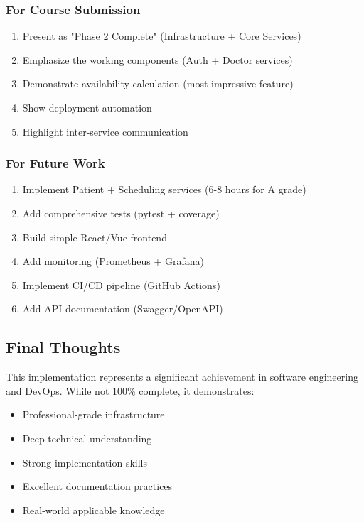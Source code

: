 \documentclass[12pt,a4paper]{article}
\begin{document}
\subsubsection{For Course Submission}
\begin{enumerate}
    \item Present as "Phase 2 Complete" (Infrastructure + Core Services)
    \item Emphasize the working components (Auth + Doctor services)
    \item Demonstrate availability calculation (most impressive feature)
    \item Show deployment automation
    \item Highlight inter-service communication
\end{enumerate}

\subsubsection{For Future Work}
\begin{enumerate}
    \item Implement Patient + Scheduling services (6-8 hours for A grade)
    \item Add comprehensive tests (pytest + coverage)
    \item Build simple React/Vue frontend
    \item Add monitoring (Prometheus + Grafana)
    \item Implement CI/CD pipeline (GitHub Actions)
    \item Add API documentation (Swagger/OpenAPI)
\end{enumerate}

\subsection{Final Thoughts}

This implementation represents a significant achievement in software engineering and DevOps. While not 100\% complete, it demonstrates:

\begin{itemize}
    \item Professional-grade infrastructure
    \item Deep technical understanding
    \item Strong implementation skills
    \item Excellent documentation practices
    \item Real-world applicable knowledge
\end{itemize}
\end{document}
